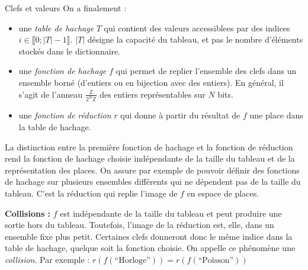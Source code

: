 \documentclass[../../../main.tex]{subfiles}
\begin{document}
\begin{definition}{Clefs et valeurs}
On a finalement :
\begin{itemize}
	\item une \textit{table de hachage} $T$ qui contient des valeurs accessiblees par des indices $i\in\llbracket 0; |T|-1\rrbracket$. $|T|$ désigne la capacité du tableau, et pas le nombre d'éléments stockés dans le dictionnaire.
	\item une \textit{fonction de hachage} $f$ qui permet de replier l'ensemble des clefs dans un ensemble borné (d'entiers ou en bijection avec des entiers). En général, il s'agit de l'anneau $\frac{\mathbb{Z}}{2^{N}\mathbb{Z}}$ des entiers représentables sur $N$ bits.
	\item une \textit{fonction de réduction} $r$ qui donne à partir du résultat de $f$ une place dans la table de hachage.
\end{itemize}
La distinction entre la première fonction de hachage et la fonction de réduction rend la fonction de hachage choisie indépendante de la taille du tableau et de la représentation des places. On assure par exemple de pouvoir définir des fonctions de hachage sur plusieurs ensembles différents qui ne dépendent pas de la taille du tableau. C'est la réduction qui replie l'image de $f$ en espace de places.

\begin{minipage}{\textwidth}
	\begin{center}
		
	\end{center}
\end{minipage}

\textbf{Collisions :} $f$ est indépendante de la taille du tableau et peut produire une sortie hors du tableau. Toutefois, l'image de la réduction est, elle, dans un ensemble fixe plus petit. Certaines clefs donneront donc le même indice dans la table de hachage, quelque soit la fonction choisie. On appelle ce phénomène une \textit{collision}. Par exemple : $r(f(\text{``Horloge''})) = r(f(\text{``Poisson''}))$

\begin{minipage}{\textwidth}
	\begin{center}
		
	\end{center}
\end{minipage}


\end{definition}
\end{document}
